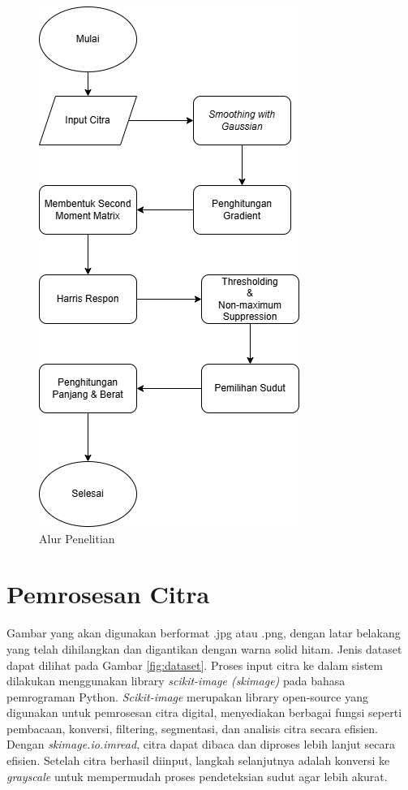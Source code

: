 \begin{figure}
    \centering
    \includegraphics[scale= 0.7]{gambar/Flowchar Penetianv2.png}
    \caption{Alur Penelitian}
    \label{Alur Penelitian}
\end{figure}

\section{Pemrosesan Citra}
    Gambar yang akan digunakan berformat .jpg atau .png, dengan latar belakang yang telah dihilangkan dan digantikan dengan warna solid hitam.  Jenis dataset dapat dilihat pada Gambar \ref{fig:dataset}.
Proses input citra ke dalam sistem dilakukan menggunakan library \emph{scikit-image (skimage)} pada bahasa pemrograman Python. \emph{Scikit-image} merupakan library open-source yang digunakan untuk pemrosesan citra digital, menyediakan berbagai fungsi seperti pembacaan, konversi, filtering, segmentasi, dan analisis citra secara efisien. Dengan \emph{skimage.io.imread}, citra dapat dibaca dan diproses lebih lanjut secara efisien.
Setelah citra berhasil diinput, langkah selanjutnya adalah konversi ke \emph{grayscale} untuk mempermudah proses pendeteksian sudut agar lebih akurat.

